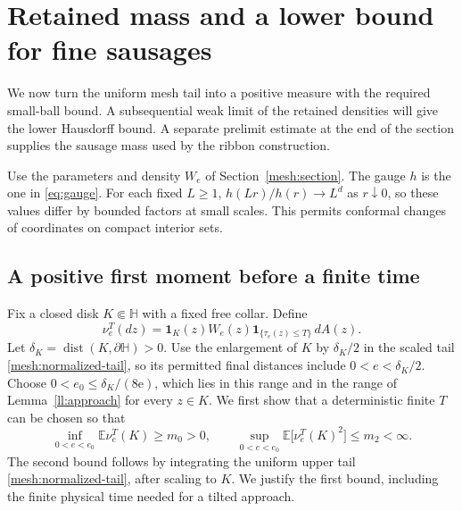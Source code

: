 \documentclass[11pt]{article}
\theoremstyle{definition}
\theoremstyle{remark}
\numberwithin{equation}{section}
\begin{document}
\section{Retained mass and a lower bound for fine sausages}
\label{retain:section}

We now turn the uniform mesh tail into a positive measure with the
required small-ball bound.  A subsequential weak limit of the retained densities will give the
lower Hausdorff bound. A separate prelimit estimate at the end of the
section supplies the sausage mass used by the ribbon construction.

Use the parameters and density $W_e$ of Section~\ref{mesh:section}.
The gauge $h$ is the one in \eqref{eq:gauge}. For each fixed $L\ge1$,
$h(Lr)/h(r)\to L^d$ as $r\downarrow0$, so these values differ by
bounded factors at small scales. This permits conformal changes of
coordinates on compact interior sets.

\subsection{A positive first moment before a finite time}

Fix a closed disk $K\Subset\mathbb H$ with a fixed free collar.  Define
\[
 \nu_e^T(dz)=\mathbf1_K(z)W_e(z)
       \mathbf1_{\{\tau_e(z)\le T\}}\,dA(z).
\]
Let $\delta_K=\operatorname{dist}(K,\partial\mathbb H)>0$.
Use the enlargement of $K$ by $\delta_K/2$ in the scaled tail
\eqref{mesh:normalized-tail}, so its permitted final distances include
$0<e<\delta_K/2$.  Choose $0<e_0\le\delta_K/(8\mathrm e)$, which
lies in this range and in the range of Lemma~\ref{ll:approach} for
every $z\in K$.
We first show that a deterministic finite $T$ can be chosen so that
\begin{equation}
 \inf_{0<e<e_0}\mathbb E\nu_e^T(K)\ge m_0>0,
 \qquad
 \sup_{0<e<e_0}\mathbb E\bigl[\nu_e^T(K)^2\bigr]\le m_2<\infty.
 \label{retain:first-second}
\end{equation}
The second bound follows by integrating the uniform upper tail
\eqref{mesh:normalized-tail}, after scaling to $K$.  We justify the first bound,
including the finite physical time needed for a tilted approach.
\end{document}
